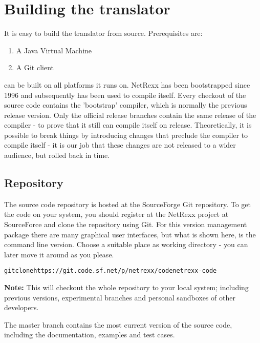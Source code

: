 \chapter{Building the \nr{} translator}
It is easy to build the \nr{} translator from source. Prerequisites
are:
\begin{enumerate}
\item A Java Virtual Machine
\item A Git client
\end{enumerate}

\nr{} can be built on all platforms it runs on. NetRexx has been
bootstrapped since 1996 and subsequently has been used to compile
itself. Every checkout of the source code contains the 'bootstrap'
compiler, which is normally the previous release version. Only the official
release branches contain the same release of the compiler - to prove
that it still can compile itself on release. Theoretically, it is
possible to break things by introducing changes that preclude the compiler to compile itself - it is our job that
these changes are not released to a wider audience, but rolled back in
time.
\section{Repository}
The \nr{} source code repository is hosted at the SourceForge Git repository. To get the code
on your system, you should register at the NetRexx project at SourceForce and clone the repository
using Git. For this version management package there are many
graphical user interfaces, but what is shown here, is the command line
version. Choose a suitable place as working directory - you can later
move it around as you please.
\begin{alltt}
git clone https://git.code.sf.net/p/netrexx/code netrexx-code
\end{alltt}

\begin{shaded}\noindent
\textbf{Note:} This will checkout
the whole repository to your local system; including previous
versions, experimental branches and personal sandboxes of other
developers. 
\end{shaded}\noindent
The master branch contains the most current version of the source
code, including the documentation, examples and test cases. 
